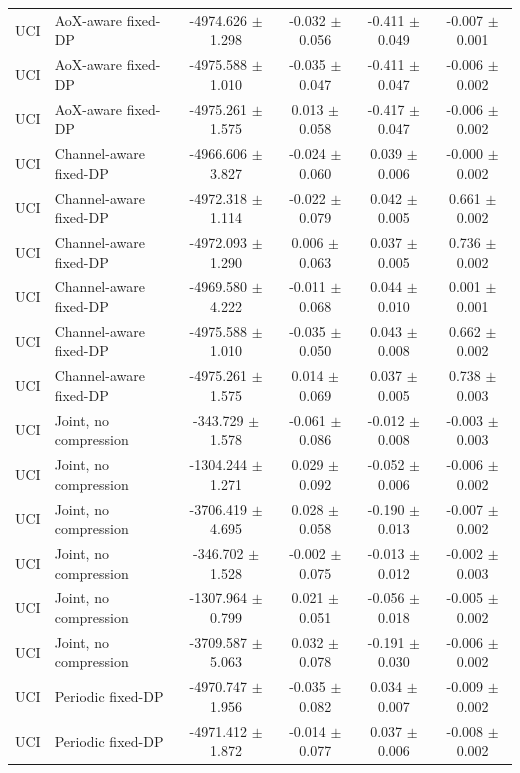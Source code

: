 \begin{tabular}{llcccc}
UCI & AoX-aware fixed-DP & -4974.626 $\pm$ 1.298 & -0.032 $\pm$ 0.056 & -0.411 $\pm$ 0.049 & -0.007 $\pm$ 0.001 \\
UCI & AoX-aware fixed-DP & -4975.588 $\pm$ 1.010 & -0.035 $\pm$ 0.047 & -0.411 $\pm$ 0.047 & -0.006 $\pm$ 0.002 \\
UCI & AoX-aware fixed-DP & -4975.261 $\pm$ 1.575 & 0.013 $\pm$ 0.058 & -0.417 $\pm$ 0.047 & -0.006 $\pm$ 0.002 \\
UCI & Channel-aware fixed-DP & -4966.606 $\pm$ 3.827 & -0.024 $\pm$ 0.060 & 0.039 $\pm$ 0.006 & -0.000 $\pm$ 0.002 \\
UCI & Channel-aware fixed-DP & -4972.318 $\pm$ 1.114 & -0.022 $\pm$ 0.079 & 0.042 $\pm$ 0.005 & 0.661 $\pm$ 0.002 \\
UCI & Channel-aware fixed-DP & -4972.093 $\pm$ 1.290 & 0.006 $\pm$ 0.063 & 0.037 $\pm$ 0.005 & 0.736 $\pm$ 0.002 \\
UCI & Channel-aware fixed-DP & -4969.580 $\pm$ 4.222 & -0.011 $\pm$ 0.068 & 0.044 $\pm$ 0.010 & 0.001 $\pm$ 0.001 \\
UCI & Channel-aware fixed-DP & -4975.588 $\pm$ 1.010 & -0.035 $\pm$ 0.050 & 0.043 $\pm$ 0.008 & 0.662 $\pm$ 0.002 \\
UCI & Channel-aware fixed-DP & -4975.261 $\pm$ 1.575 & 0.014 $\pm$ 0.069 & 0.037 $\pm$ 0.005 & 0.738 $\pm$ 0.003 \\
UCI & Joint, no compression & -343.729 $\pm$ 1.578 & -0.061 $\pm$ 0.086 & -0.012 $\pm$ 0.008 & -0.003 $\pm$ 0.003 \\
UCI & Joint, no compression & -1304.244 $\pm$ 1.271 & 0.029 $\pm$ 0.092 & -0.052 $\pm$ 0.006 & -0.006 $\pm$ 0.002 \\
UCI & Joint, no compression & -3706.419 $\pm$ 4.695 & 0.028 $\pm$ 0.058 & -0.190 $\pm$ 0.013 & -0.007 $\pm$ 0.002 \\
UCI & Joint, no compression & -346.702 $\pm$ 1.528 & -0.002 $\pm$ 0.075 & -0.013 $\pm$ 0.012 & -0.002 $\pm$ 0.003 \\
UCI & Joint, no compression & -1307.964 $\pm$ 0.799 & 0.021 $\pm$ 0.051 & -0.056 $\pm$ 0.018 & -0.005 $\pm$ 0.002 \\
UCI & Joint, no compression & -3709.587 $\pm$ 5.063 & 0.032 $\pm$ 0.078 & -0.191 $\pm$ 0.030 & -0.006 $\pm$ 0.002 \\
UCI & Periodic fixed-DP & -4970.747 $\pm$ 1.956 & -0.035 $\pm$ 0.082 & 0.034 $\pm$ 0.007 & -0.009 $\pm$ 0.002 \\
UCI & Periodic fixed-DP & -4971.412 $\pm$ 1.872 & -0.014 $\pm$ 0.077 & 0.037 $\pm$ 0.006 & -0.008 $\pm$ 0.002 \\

\end{tabular}
